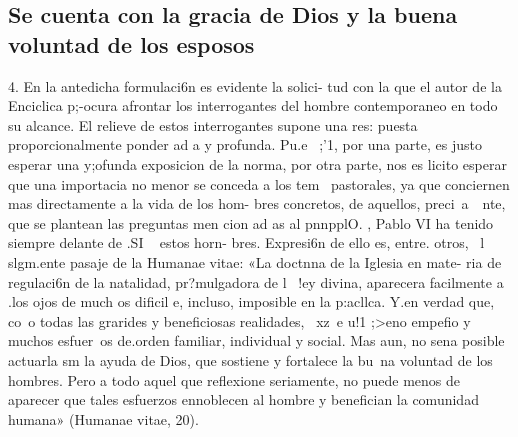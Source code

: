 \documentclass[letterpaper]{report}
\begin{document}
		\subsection{Se cuenta con la gracia de Dios y la buena voluntad de los esposos}
			4. En la antedicha formulaci6n es evidente la solici- 
			tud con la que el autor de la Enciclica p;-ocura afrontar 
			los interrogantes del hombre contemporaneo en todo su 
			alcance. El relieve de estos interrogantes supone una res: 
			puesta proporcionalmente ponder ad a y profunda. Pu.e~ ;'1, 
			por una parte, es justo esperar una y;ofunda exposicion 
			de la norma, por otra parte, nos es licito esperar que una 
			importacia no menor se conceda a los tem~ pastorales, ya 
			que conciernen mas directamente a la vida de los hom- 
			bres concretos, de aquellos, preci~a~~nte, que se plantean 
				las preguntas men cion ad as al pnnpplO. 	, 
			Pablo VI ha tenido siempre delante de .SI ~ estos horn- 
			bres. Expresi6n de ello es, entre. otros, ~l slgm.ente pasaje 
			de la Humanae vitae: «La doctnna de la Iglesia en mate- 
			ria de regulaci6n de la natalidad, pr?mulgadora de l~ !ey 
			divina, aparecera facilmente a .los ojos de much os dificil 
			e, incluso, imposible en la p:acllca. Y.en verdad que, co~o 
			todas las grarides y beneficiosas realidades, ~xz~e u!1 ;>eno 
			empefio y muchos esfuer~os de.orden familiar, individual 
			y social. Mas aun, no sena posible actuarla sm la ayuda 
			de Dios, que sostiene y fortalece la bu~na voluntad de los 
			hombres. Pero a todo aquel que reflexione seriamente, no 
			puede menos de aparecer que tales esfuerzos ennoblecen 
			al hombre y benefician la comunidad humana» (Humanae 
			vitae, 20).
			
\end{document}
